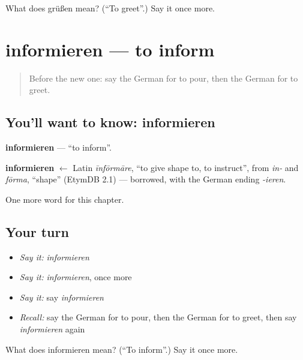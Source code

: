 \begin{tcolorbox}[breakable,colback=teal!4,colframe=teal!35!black,title={Before you move on}]
What does grüßen mean? (\textquotedblleft{}To greet\textquotedblright{}.) Say it once more.
\end{tcolorbox}
\section[informieren]{informieren — to inform}

\label{lesson:GE-C181-informieren}



\begin{quote}
Before the new one: say the German for to pour, then the German for to greet.
\end{quote}

\subsection*{You'll want to know: informieren}
\textbf{informieren} — \textquotedblleft{}to inform\textquotedblright{}.

\begin{cousinweb}
\textbf{informieren} $\leftarrow$ Latin \emph{īnfōrmāre}, \textquotedblleft{}to give shape to, to instruct\textquotedblright{}, from \emph{in-} and \emph{fōrma}, \textquotedblleft{}shape\textquotedblright{} (EtymDB 2.1) — borrowed, with the German ending \emph{-ieren}.
\end{cousinweb}

\begin{grammarlens}[title={What you've built}]
One more word for this chapter.
\end{grammarlens}

\subsection*{Your turn}
\begin{itemize}
\raggedright
  \item \emph{Say it:} \emph{informieren}
  \item \emph{Say it:} \emph{informieren}, once more
  \item \emph{Say it:} say \emph{informieren}
  \item \emph{Recall:} say the German for to pour, then the German for to greet, then say \emph{informieren} again
\end{itemize}

\begin{tcolorbox}[breakable,colback=teal!4,colframe=teal!35!black,title={Before you move on}]
What does informieren mean? (\textquotedblleft{}To inform\textquotedblright{}.) Say it once more.
\end{tcolorbox}
